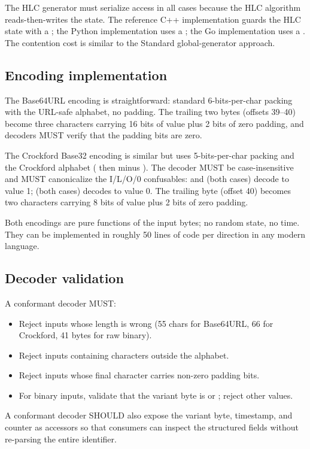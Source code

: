 The HLC generator must serialize access in all cases because the HLC algorithm reads-then-writes the  state. The reference C++ implementation guards the HLC state with a ; the Python implementation uses a ; the Go implementation uses a . The contention cost is similar to the Standard global-generator approach.

\subsection{Encoding implementation}

The Base64URL encoding is straightforward: standard 6-bits-per-char packing with the URL-safe alphabet, no padding. The trailing two bytes (offsets 39--40) become three characters carrying 16 bits of value plus 2 bits of zero padding, and decoders MUST verify that the padding bits are zero.

The Crockford Base32 encoding is similar but uses 5-bits-per-char packing and the Crockford alphabet ( then  minus ). The decoder MUST be case-insensitive and MUST canonicalize the I/L/O/0 confusables:  and  (both cases) decode to value 1;  (both cases) decodes to value 0. The trailing byte (offset 40) becomes two characters carrying 8 bits of value plus 2 bits of zero padding.

Both encodings are pure functions of the input bytes; no random state, no time. They can be implemented in roughly 50 lines of code per direction in any modern language.

\subsection{Decoder validation}

A conformant decoder MUST:

\begin{itemize}
  \item Reject inputs whose length is wrong (55 chars for Base64URL, 66 for Crockford, 41 bytes for raw binary).
  \item Reject inputs containing characters outside the alphabet.
  \item Reject inputs whose final character carries non-zero padding bits.
  \item For binary inputs, validate that the variant byte is  or ; reject other values.
\end{itemize}

A conformant decoder SHOULD also expose the variant byte, timestamp, and counter as accessors so that consumers can inspect the structured fields without re-parsing the entire identifier.

